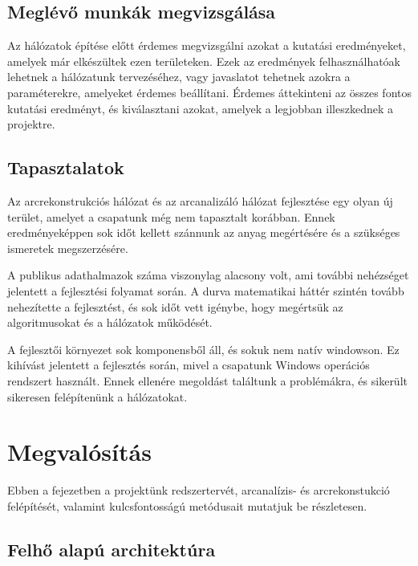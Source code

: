 \documentclass[12pt,a4]{article}
\begin{document}
        \subsection{Meglévő munkák megvizsgálása}

        Az hálózatok építése előtt érdemes megvizsgálni azokat a kutatási eredményeket, amelyek már elkészültek ezen területeken. Ezek az eredmények felhasználhatóak lehetnek a hálózatunk tervezéséhez, vagy javaslatot tehetnek azokra a paraméterekre, amelyeket érdemes beállítani. Érdemes áttekinteni az összes fontos kutatási eredményt, és kiválasztani azokat, amelyek a legjobban illeszkednek a projektre.
        
        \subsection{Tapasztalatok}

        Az arcrekonstrukciós hálózat és az arcanalizáló hálózat fejlesztése egy olyan új terület, amelyet a csapatunk még nem tapasztalt korábban. Ennek eredményeképpen sok időt kellett szánnunk az anyag megértésére és a szükséges ismeretek megszerzésére.

        A publikus adathalmazok száma viszonylag alacsony volt, ami további nehézséget jelentett a fejlesztési folyamat során. A durva matematikai háttér szintén tovább nehezítette a fejlesztést, és sok időt vett igénybe, hogy megértsük az algoritmusokat és a hálózatok működését.
        
        A fejlesztői környezet sok komponensből áll, és sokuk nem natív windowson. Ez kihívást jelentett a fejlesztés során, mivel a csapatunk Windows operációs rendszert használt. Ennek ellenére megoldást találtunk a problémákra, és sikerült sikeresen felépítenünk a hálózatokat.
    
    \section{Megvalósítás}
    
        Ebben a fejezetben a projektünk redszertervét, arcanalízis- és arcrekonstukció felépítését, valamint kulcsfontosságú metódusait mutatjuk be részletesen.
        
        \subsection{Felhő alapú architektúra}
        
\end{document}
